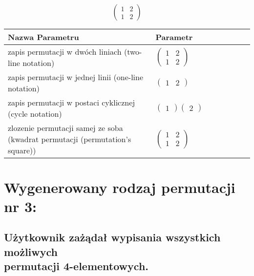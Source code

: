 \documentclass[12pt]{article}
\begin{document}
\subsection{}
\begin{center}
\[
\begin{pmatrix}
	1 & 2 \\ 
	1 & 2 
\end{pmatrix}
\]

\begin{tabular}{|m{0.6\linewidth}|m{0.4\linewidth}|}
	\hline
	Nazwa Parametru & Parametr \\
	\hline
	zapis permutacji w dwóch liniach (two-line notation) & $\begin{pmatrix} 1 & 2 \\ 
1 & 2 \end{pmatrix}$ \\ 
	\hline
	zapis permutacji w jednej linii (one-line notation) & $\begin{pmatrix} 1 & 2 \end{pmatrix}$ \\ 
	\hline
	zapis permutacji w postaci cyklicznej (cycle notation) & $\begin{pmatrix} 1 \end{pmatrix} \begin{pmatrix} 2 \end{pmatrix} $ \\ 
	\hline
	zlozenie permutacji samej ze soba (kwadrat permutacji (permutation's square)) & $\begin{pmatrix} 1 & 2 \\ 
1 & 2 \end{pmatrix}$ \\ 
	\hline
\end{tabular}
\end{center}


\section{Wygenerowany rodzaj permutacji nr 3:}
\subsection*{Użytkownik zażądał wypisania wszystkich możliwych\\ permutacji 4-elementowych.}
\end{document}
